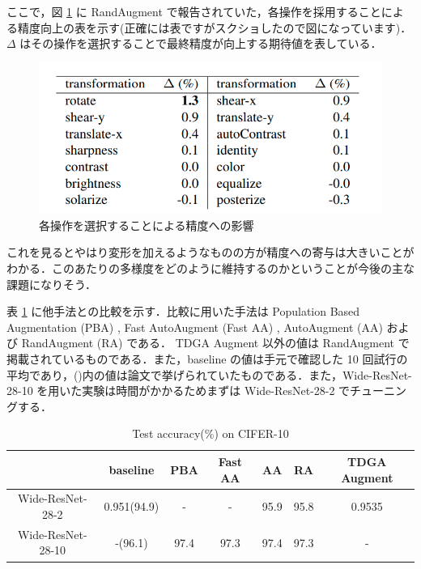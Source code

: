 \documentclass[onecolumn]{ujarticle}   %
\begin{document}
  ここで，図 \ref{fig:transform_importance} に RandAugment で報告されていた，各操作を採用することによる精度向上の表を示す(正確には表ですがスクショしたので図になっています)．$\Delta$ はその操作を選択することで最終精度が向上する期待値を表している．

  \begin{figure}[ht]
    \begin{center}
      \includegraphics[width=0.7\columnwidth]{operation_importance.png}
      \caption{各操作を選択することによる精度への影響}
      \label{fig:transform_importance}
    \end{center}
  \end{figure}

  これを見るとやはり変形を加えるようなものの方が精度への寄与は大きいことがわかる．このあたりの多様度をどのように維持するのかということが今後の主な課題になりそう．

  表 \ref{tab:compare_cider10} に他手法との比較を示す．比較に用いた手法は Population Based Augmentation (PBA) \cite{DBLP:journals/corr/abs-1905-05393}, Fast AutoAugment (Fast AA) \cite{DBLP:journals/corr/abs-1905-00397}, AutoAugment (AA) \cite{DBLP:journals/corr/abs-1801-02929} および  RandAugment (RA) \cite{Cubuk2019RandAugmentPA} である． TDGA Augment 以外の値は RandAugment で掲載されているものである．また，baseline の値は手元で確認した 10 回試行の平均であり，()内の値は論文で挙げられていたものである．また，Wide-ResNet-28-10 を用いた実験は時間がかかるためまずは Wide-ResNet-28-2 でチューニングする．

  \begin{table}[ht]
		\centering
		\caption{Test accuracy(\%) on CIFER-10}
		\label{tab:compare_cider10}
		\begin{tabular}{c||c c c c c|c} \hline
		  &baseline&PBA&Fast AA&AA&RA&TDGA Augment\\ \hline
			Wide-ResNet-28-2&0.951(94.9)&-&-&95.9&95.8&0.9535\\
			Wide-ResNet-28-10&-(96.1)&97.4&97.3&97.4&97.3&-\\ \hline
		\end{tabular}
	\end{table}
\end{document}
